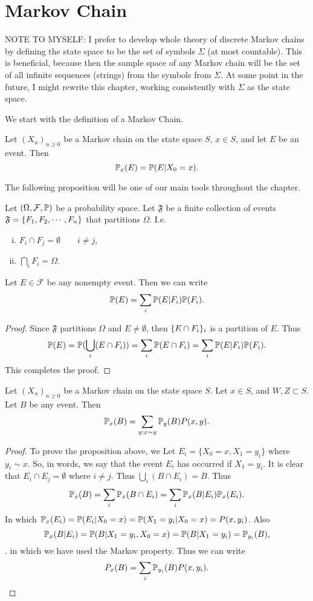 \chapter{Markov Chain}
NOTE TO MYSELF: I prefer to develop whole theory of discrete Markov chains by defining the state space to be the set of symbols $\Sigma$ (at most countable). This is beneficial, because then the sample space of any Markov chain will be the set of all infinite sequences (strings) from the symbols from $\Sigma$. At some point in the future, I might rewrite this chapter, working consistently with $\Sigma$ as the state space.

We start with the definition of a Markov Chain.
\begin{notation}
	Let $(X_n)_{n\geq0}$ be a Markov chain on the state space $S$, $x\in S$, and let $E$ be an event. Then
	\[  \mathbb{P}_x(E) = \mathbb{P}(E|X_0=x) . \]
\end{notation}
The following proposition will be one of our main tools throughout the chapter.
\begin{proposition}
	Let $(\Omega, \mathcal{F}, \mathbb{P})$ be a probability space. Let $\mathfrak{F}$ be a finite collection of events $\mathfrak{F} = \{F_1,F_2,\cdots, F_n\}$ that partitions $\Omega$. I.e.
	\begin{enumerate}[(i)]
		\item $F_i \cap F_j = \emptyset \qquad i\neq j$,
		\item $\bigcap_{i} F_i = \Omega$.
	\end{enumerate}
	Let $E \in \mathcal{F}$ be any nonempty event. Then we can write
	\[  \mathbb{P}(E) = \sum_{i} \mathbb{P}(E|F_i)\mathbb{P}(F_i). \]
\end{proposition}
\begin{proof}
	Since $\mathfrak{F}$ partitions $\Omega$ and $E \neq \emptyset$, then $\{E\cap F_i\}_i$ is a partition of $E$. Thus
	\[ \mathbb{P}(E) = \mathbb{P}(\bigcup_i (E \cap F_i)) = \sum_i \mathbb{P}(E \cap F_i) = \sum_i \mathbb{P}(E|F_i)\mathbb{P}(F_i). \]
	This completes the proof.
\end{proof}



\begin{proposition}
	Let $(X_n)_{n\geq 0}$ be a Markov chain on the state space $S$. Let $x\in S$, and $W,Z \subset S$. Let $B$ be any event. Then
	\[ \mathbb{P}_x(B) = \sum_{y:x\sim y} \mathbb{P}_y(B)P(x,y). \]
	\label{prop:FirstTimeStepArgument}
\end{proposition}
\begin{proof}
	To prove the proposition above, we Let $E_i = \{ X_0=x, X_1=y_i \}$ where $y_i \sim x$. So, in words, we say that the event $E_i$ has occurred if $X_1 = y_i$. It is clear that $E_i \cap E_j = \emptyset$ where $i\neq j$. Thus $\bigcup_{i}(B\cap E_i) = B$. Thus 
	\[ \mathbb{P}_x(B) = \sum_{i} \mathbb{P}_x(B \cap E_i) = \sum_{i}\mathbb{P}_x(B|E_i)\mathbb{P}_x(E_i). \]
	In which $\mathbb{P}_x(E_i) = \mathbb{P}(E_i|X_0=x) = \mathbb{P}(X_1=y_i|X_0=x) = P(x,y_i)  $. Also \[\mathbb{P}_x(B|E_i) = \mathbb{P}(B|X_1=y_i, X_0=x) = \mathbb{P}(B|X_1=y_i) = \mathbb{P}_{y_i}(B),\].
	in which we have used the Markov property. Thus we can write
	\[ P_x(B) = \sum_i \mathbb{P}_{y_i}(B)P(x,y_i). \]
\end{proof}


